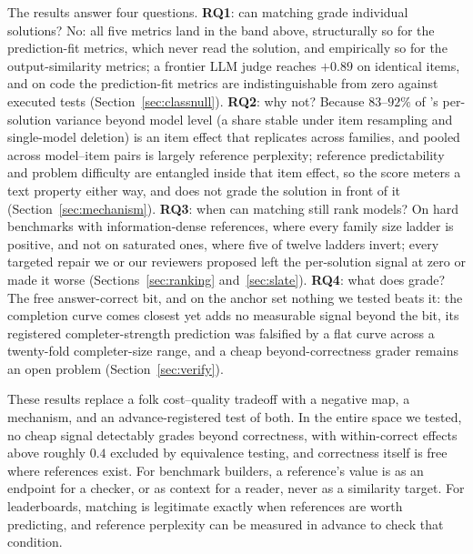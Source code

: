 The results answer four questions.
\textbf{RQ1}: can matching grade individual solutions? No: all five metrics land in the band above, structurally so for the prediction-fit metrics, which never read the solution, and empirically so for the output-similarity metrics; a frontier LLM judge reaches $+0.89$ on identical items, and on code the prediction-fit metrics are indistinguishable from zero against executed tests (Section~\ref{sec:classnull}).
\textbf{RQ2}: why not? Because $83$--$92\%$ of \tfa's per-solution variance beyond model level (a share stable under item resampling and single-model deletion) is an item effect that replicates across families, and pooled across model--item pairs \tfa{} is largely reference perplexity; reference predictability and problem difficulty are entangled inside that item effect, so the score meters a text property either way, and does not grade the solution in front of it (Section~\ref{sec:mechanism}).
\textbf{RQ3}: when can matching still rank models? On hard benchmarks with information-dense references, where every family size ladder is positive, and not on saturated ones, where five of twelve ladders invert; every targeted repair we or our reviewers proposed left the per-solution signal at zero or made it worse (Sections~\ref{sec:ranking} and~\ref{sec:slate}).
\textbf{RQ4}: what does grade? The free answer-correct bit, and on the anchor set nothing we tested beats it: the completion curve comes closest yet adds no measurable signal beyond the bit, its registered completer-strength prediction was falsified by a flat curve across a twenty-fold completer-size range, and a cheap beyond-correctness grader remains an open problem (Section~\ref{sec:verify}).

These results replace a folk cost--quality tradeoff with a negative map, a mechanism, and an advance-registered test of both.
In the entire space we tested, no cheap signal detectably grades beyond correctness, with within-correct effects above roughly $0.4$ excluded by equivalence testing, and correctness itself is free where references exist.
For benchmark builders, a reference's value is as an endpoint for a checker, or as context for a reader, never as a similarity target.
For leaderboards, matching is legitimate exactly when references are worth predicting, and reference perplexity can be measured in advance to check that condition.

